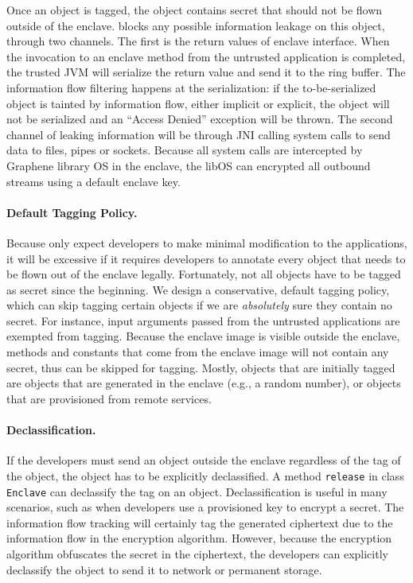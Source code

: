 Once an object is tagged, the object contains secret that should not be
flown outside of the enclave.
\sysname{} blocks any possible information leakage on this object,
through two channels.
The first is the return values of enclave interface.
When the invocation to an enclave method from the untrusted application
is completed,
the trusted JVM will serialize the return value and
send it to the ring buffer.
The information flow filtering happens at the serialization:
if the to-be-serialized object is tainted by information flow,
either implicit or explicit,
the object will not be serialized and an ``Access Denied''
exception will be thrown.
The second channel of leaking information will be through
JNI calling system calls
to send data to files, pipes or sockets.
Because all system calls are intercepted by
Graphene library OS in the enclave,
the libOS can encrypted all outbound streams using a default enclave key.

\paragraph{Default Tagging Policy.}
Because \sysname{} only expect developers to make minimal modification
to the applications,
it will be excessive if it requires developers to
annotate every object that needs to be flown out of the enclave legally.
Fortunately, not all objects have to be tagged as secret since the beginning.
We design a conservative, default tagging policy,
which can skip tagging certain objects
if we are {\em absolutely} sure they contain no secret.
For instance, input arguments passed from the untrusted applications are
exempted from tagging.
Because the enclave image is visible outside the enclave,
methods and constants that come from the enclave image
will not contain any secret,
thus can be skipped for tagging.
Mostly, objects that are initially tagged are
objects that are generated in the enclave (e.g., a random number),
or objects that are provisioned from remote services.

\paragraph{Declassification.}
If the developers must send an object outside the enclave
regardless of the tag of the object,
the object has to be explicitly declassified.
A method {\tt release} in class {\tt Enclave} can declassify the tag
on an object.
Declassification is useful in many scenarios,
such as when developers use a provisioned key to encrypt a secret.
The information flow tracking will certainly tag the generated ciphertext
due to the information flow in the encryption algorithm.
However, because the encryption algorithm obfuscates the secret in the ciphertext,
the developers can explicitly declassify the object
to send it to network or permanent storage.

